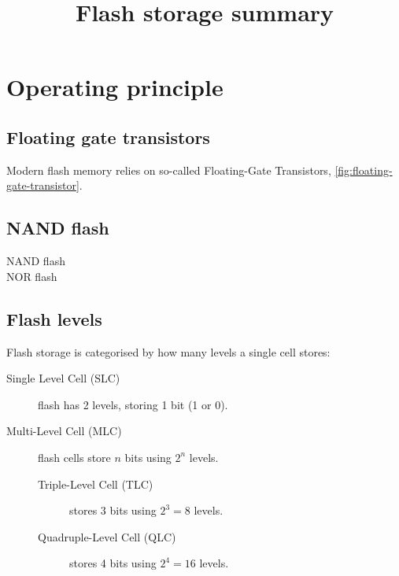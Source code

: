 \documentclass[slides]{pgnotes}
\title{Flash storage summary}
\begin{document}
\maketitle

\section{Operating principle}

\subsection{Floating gate transistors}

Modern flash memory relies on so-called Floating-Gate Transistors, \autoref{fig:floating-gate-transistor}.


\subsection{NAND flash}

\begin{description}
\item[NAND flash]
\item[NOR flash]
\end{description}



\subsection{Flash levels}

Flash storage is categorised by how many levels a single cell stores: 

\begin{description}
\item[Single Level Cell (SLC)] flash has 2 levels, storing 1 bit (1 or 0).
\item[Multi-Level Cell (MLC)] flash cells store $n$ bits using $2^n$ levels.
  \begin{description}
  \item[Triple-Level Cell (TLC)] stores 3 bits using $2^3=8$ levels.
  \item[Quadruple-Level Cell (QLC)] stores 4 bits using $2^4=16$ levels.
  \end{description}
\end{description}
\end{document}
